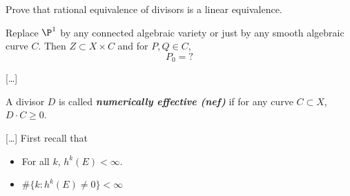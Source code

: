 \begin{exercise}
	Prove that rational equivalence of divisors is a linear equivalence.
\end{exercise}
\begin{defn}
	Replace $\P^1$ by any connected algebraic variety or just by any smooth algebraic curve $C$. Then $Z\subset X\times C$ and for $P,Q\in C$,
	\[P_0=?\]
\end{defn}
[…]
\begin{defn}
	A divisor $D$ is called \textbf{\textit{numerically effective (nef)}} if for any curve $C\subset X$, $D\cdot C\geq0$.
\end{defn}
[…]
First recall that
\begin{thm}[Grauert]\leavevmode
	\begin{itemize}
		\item For all $k$, $h^k(E)<\infty$.
		\item $\#\{k:h^k(E)\neq0\}<\infty$
	\end{itemize}
\end{thm}
